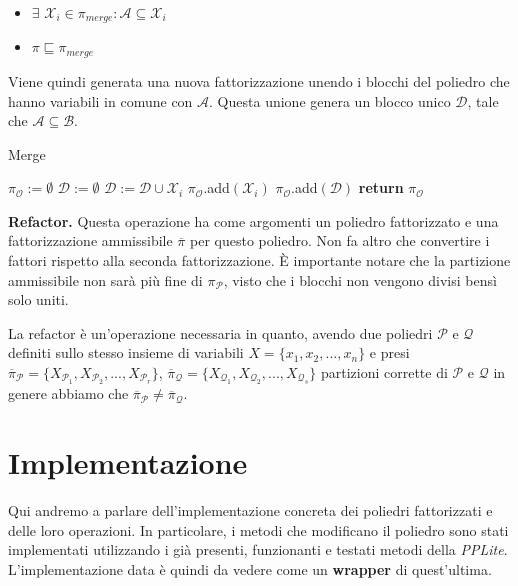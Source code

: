 \documentclass{mimosis}
\theoremstyle{definition}
\begin{document}
\begin{itemize}
\item \(\exists\) \(\mathcal{X}_i \in \pi_{merge} : \mathcal{A} \subseteq \mathcal{X}_i\)
\item \(\pi \sqsubseteq \pi_{merge}\)
\end{itemize}

Viene quindi generata una nuova fattorizzazione unendo i blocchi del poliedro
che hanno variabili in comune con \(\mathcal{A}\). Questa unione genera un blocco
unico \(\mathcal{D}\), tale che \(\mathcal{A} \subseteq \mathcal{B}\).

\begin{algorithm}[H]
\caption{Merge}\label{merge}
\begin{algorithmic}[1]
\State$\pi_{\mathcal{O}} := \emptyset$
\State$\mathcal{D} := \emptyset$
\State$\mathcal{D} := \mathcal{D} \cup \mathcal{X}_{i}$
\Else
\State$\pi_{\mathcal{O}}$.add$(\mathcal{X}_{i})$
\EndIf
\EndFor
\State$\pi_{\mathcal{O}}$.add$(\mathcal{D})$
\State\textbf{return} $\pi_{\mathcal{O}}$
\EndFunction
\end{algorithmic}
\end{algorithm}

\-\hspace{0.1cm} \textbf{Refactor.} Questa operazione ha come argomenti un poliedro
fattorizzato e una fattorizzazione ammissibile \(\overline{\pi}\) per questo
poliedro. Non fa altro che convertire i fattori rispetto alla seconda
fattorizzazione. È importante notare che la partizione ammissibile non sarà più
fine di \(\pi_{\mathcal{P}}\), visto che i blocchi non vengono divisi bensì solo
uniti.

La refactor è un'operazione necessaria in quanto, avendo due poliedri
\(\mathcal{P}\) e \(\mathcal{Q}\) definiti sullo stesso insieme di variabili \(X =
\{x_1, x_2, ..., x_n\}\) e presi \(\overline{\pi}_{\mathcal{P}} =
\{X_{\mathcal{P}_1}, X_{\mathcal{P}_2}, ..., X_{\mathcal{P}_r}\}\),
\(\overline{\pi}_{\mathcal{Q}} = \{X_{\mathcal{Q}_1}, X_{\mathcal{Q}_2}, ...,
X_{\mathcal{Q}_s}\}\)
partizioni corrette di \(\mathcal{P}\) e \(\mathcal{Q}\) in genere abbiamo che
\(\overline{\pi}_{\mathcal{P}} \ne \overline{\pi}_{\mathcal{Q}}\).
\chapter{Implementazione}
\label{sec:orga7122d4}
Qui andremo a parlare dell'implementazione concreta dei poliedri fattorizzati e
delle loro operazioni. In particolare, i metodi che modificano il poliedro
sono stati implementati utilizzando i già presenti, funzionanti e testati metodi
della \emph{PPLite}. L'implementazione data è quindi da vedere come un \textbf{wrapper} di
quest'ultima.
\end{document}
